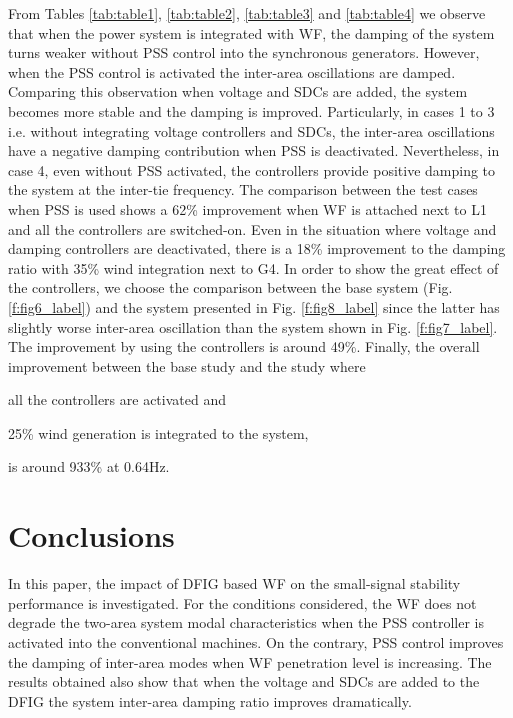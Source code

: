 \documentclass[conference,11pt]{IEEEtran}
\begin{document}
From Tables \ref{tab:table1}, \ref{tab:table2}, \ref{tab:table3} and \ref{tab:table4} we observe that when the power system is integrated with WF, the damping of the system turns weaker without PSS control into the synchronous generators. However, when the PSS control is activated the inter-area  oscillations are damped. Comparing this observation when voltage and SDCs are added, the system becomes more stable and the damping is improved. Particularly, in cases 1 to 3 i.e. without integrating voltage controllers and SDCs, the inter-area oscillations have a negative damping contribution when PSS is deactivated. Nevertheless, in case 4, even without PSS activated, the controllers provide positive damping to the system at the inter-tie frequency. The comparison between the test cases when PSS is used shows a 62\% improvement when WF is attached next to L1 and all the controllers are switched-on. Even in the situation where voltage and damping controllers are deactivated, there is a 18\% improvement to the damping ratio with 35\% wind integration next to G4. In order to show the great effect of the controllers, we choose the comparison between the base system (Fig. \ref{f:fig6_label}) and the system presented in Fig. \ref{f:fig8_label} since the latter has slightly worse inter-area oscillation than the system shown in Fig. \ref{f:fig7_label}. The improvement by using the controllers is around 49\%. Finally, the overall improvement between the base study and the study where \begin{enumerate*}[label=\itshape\alph*\upshape)]
\item all the controllers are activated and 
\item 25\% wind generation is integrated to the system, 
\end{enumerate*} is around 933\% at 0.64Hz.

\section{Conclusions}\label{s:conclusions}

In this paper, the impact of DFIG based WF on the small-signal stability performance is investigated. For the conditions considered, the WF does not degrade the two-area system modal characteristics when the PSS controller is activated into the conventional machines. On the contrary, PSS control improves the damping of inter-area modes when WF penetration level is increasing. The results obtained also show that when the voltage and SDCs are added to the DFIG the system inter-area damping ratio improves dramatically.

 
\end{document}
